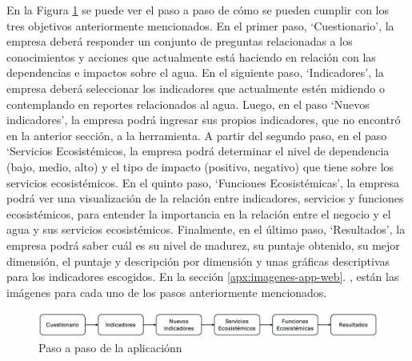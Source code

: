 En la Figura \ref{fig:paso-paso-app} se puede ver el paso a paso de cómo se pueden cumplir con los tres objetivos anteriormente mencionados. En el primer paso, ‘Cuestionario’, la empresa deberá responder un conjunto de preguntas relacionadas a los conocimientos y acciones que actualmente está haciendo en relación con las dependencias e impactos sobre el agua. En el siguiente paso, ‘Indicadores’, la empresa deberá seleccionar los indicadores que actualmente estén midiendo o contemplando en reportes relacionados al agua. Luego, en el paso ‘Nuevos indicadores’, la empresa podrá ingresar sus propios indicadores, que no encontró en la anterior sección, a la herramienta. A partir del segundo paso, en el paso ‘Servicios Ecosistémicos, la empresa podrá determinar el nivel de dependencia (bajo, medio, alto) y el tipo de impacto (positivo, negativo) que tiene sobre los servicios ecosistémicos. En el quinto paso, ‘Funciones Ecosistémicas’, la empresa podrá ver una visualización de la relación entre indicadores, servicios y funciones ecosistémicos, para entender la importancia en la relación entre el negocio y el agua y sus servicios ecosistémicos. Finalmente, en el último paso, ‘Resultados’, la empresa podrá saber cuál es su nivel de madurez, su puntaje obtenido, su mejor dimensión, el puntaje y descripción por dimensión y unas gráficas descriptivas para los indicadores escogidos. En la sección \ref{apx:imagenes-app-web}. , están las imágenes para cada uno de los pasos anteriormente mencionados.

\begin{figure}[H]
    \centering
    \includegraphics[scale=0.4]{images/5-implementacion/paso-a-paso-app.png}
    \caption{Paso a paso de la aplicaciónn}
    \label{fig:paso-paso-app}
\end{figure}